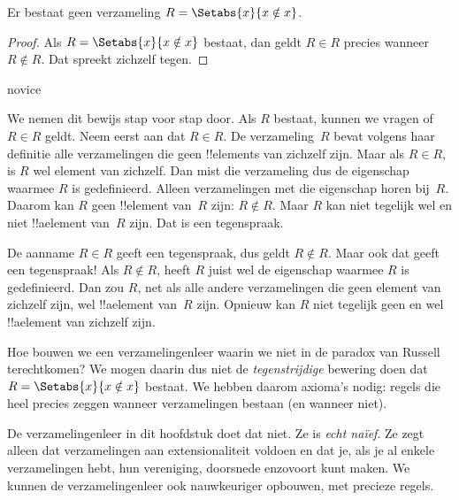 \documentclass[openany]{memoir}
\begin{document}
\begin{thm}
	Er bestaat geen verzameling $R = \Setabs{x}{x \notin x}$.
\end{thm}

\begin{proof}
Als $R = \Setabs{x}{x \notin x}$ bestaat, dan geldt
$R \in R$ precies wanneer $R \notin R$. Dat spreekt zichzelf tegen.
\end{proof}

\begin{tagblock}{novice}
\begin{explain}
We nemen dit bewijs stap voor stap door. Als $R$ bestaat, kunnen we
vragen of $R \in R$ geldt. Neem eerst aan dat $R \in R$. De
verzameling~$R$ bevat volgens haar definitie alle verzamelingen die
geen !!{element}s van zichzelf zijn. Maar als $R \in R$, is $R$ wel
element van zichzelf. Dan mist die verzameling dus de eigenschap waarmee $R$
is gedefinieerd. Alleen verzamelingen met die eigenschap horen
bij~$R$. Daarom kan $R$ geen !!{element} van~$R$ zijn: $R \notin R$.
Maar $R$ kan niet tegelijk wel en niet !!a{element} van~$R$ zijn.
Dat is een tegenspraak.

De aanname $R \in R$ geeft een tegenspraak, dus geldt $R \notin R$.
Maar ook dat geeft een tegenspraak!{} Als $R \notin R$, heeft $R$
juist wel de eigenschap waarmee $R$ is gedefinieerd. Dan zou $R$, net
als alle andere verzamelingen die geen element van zichzelf zijn, wel
!!a{element} van~$R$ zijn. Opnieuw kan $R$ niet tegelijk geen en wel
!!a{element} van zichzelf zijn.
\end{explain}
\end{tagblock}

\begin{digress}
Hoe bouwen we een verzamelingenleer waarin we niet in de paradox van
Russell terechtkomen? We mogen daarin dus niet de
\emph{tegenstrijdige} bewering doen dat $R = \Setabs{x}{x \notin x}$
bestaat. We hebben daarom axioma's nodig: regels die heel precies
zeggen wanneer verzamelingen bestaan (en wanneer niet).
	
De verzamelingenleer in dit hoofdstuk doet dat niet. Ze is
\emph{echt na\"ief}. Ze zegt alleen dat verzamelingen aan
extensionaliteit voldoen en dat je, als je al enkele verzamelingen
hebt, hun vereniging, doorsnede enzovoort kunt maken. We kunnen de
verzamelingenleer ook nauwkeuriger opbouwen, met precieze regels.
\end{digress}
\endgroup
\OLEndChapterHook
\end{document}
